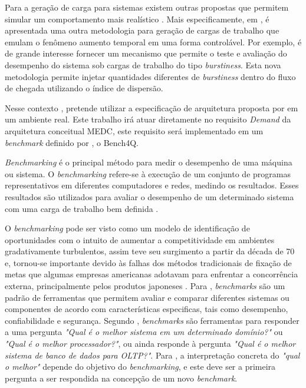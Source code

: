 Para a geração de carga para sistemas existem outras propostas que permitem simular um comportamento mais realístico \cite{Mi2010, Mi2009,Mi2008}. Mais especificamente, em , é apresentada uma outra metodologia para geração de cargas de trabalho que emulam o fenômeno aumento temporal em uma forma controlável. Por exemplo, é de grande interesse fornecer um mecanismo que permite o teste e avaliação do desempenho do sistema sob cargas de trabalho do tipo \textit{burstiness}. Esta nova metodologia permite injetar quantidades diferentes de \textit{burstiness} dentro do fluxo de chegada utilizando o índice de dispersão. 

Nesse contexto , pretende utilizar a especificação de arquitetura proposta por  em um ambiente real. Este trabalho irá atuar diretamente no requisito \textit{Demand} da arquitetura conceitual MEDC, este requisito será implementado em um \textit{benchmark} definido por , o Bench4Q.

\textit{Benchmarking} é o principal método para medir o desempenho de uma máquina ou sistema. O \textit{benchmarking} refere-se à execução de um conjunto de programas representativos em diferentes computadores e redes, medindo os resultados. Esses resultados são utilizados para avaliar o desempenho de um determinado sistema com uma carga de trabalho bem definida \cite{Menasce2001}.

O \textit{benchmarking} pode ser visto como um modelo de identificação de oportunidades com o intuito de aumentar a competitividade em ambientes gradativamente turbulentos, assim teve seu surgimento a partir da década de 70 e, tornou-se importante devido às falhas dos métodos tradicionais de fixação de metas que algumas empresas americanas adotavam para enfrentar a concorrência externa, principalmente pelos produtos japoneses \cite{Camila2008}. Para , \textit{benchmarks} são um padrão de ferramentas que permitem avaliar e comparar diferentes sistemas ou componentes de acordo com características especificas, tais como desempenho, confiabilidade e segurança. Segundo , \textit{benchmarks} são ferramentas para responder a uma pergunta \textit{"Qual é o melhor sistema em um determinado domínio?"} ou  \textit{"Qual é o melhor processador?"}, ou ainda responde à pergunta \textit{"Qual é o melhor sistema de banco de dados para OLTP?"}. Para , a interpretação concreta do \textit{"qual o melhor"} depende do objetivo do \textit{benchmarking}, e este deve ser a primeira pergunta a ser respondida na concepção de um novo \textit{benchmark}. 


